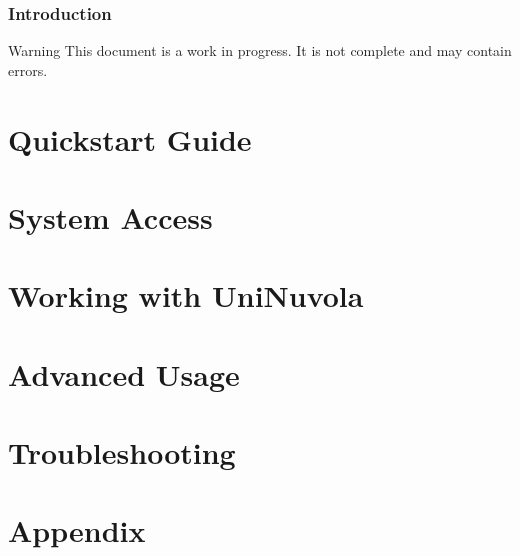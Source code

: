 \documentclass[a4paper,11pt]{article}
\begin{document}


\tableofcontents
\newpage

\section*{Introduction}

\begin{bclogo}[logo=\bcinfo, couleurBarre=orange, noborder=true, couleur=white]{Warning}
This document is a work in progress. It is not complete and may contain errors.
\end{bclogo}



\pagebreak
\part{Quickstart Guide}


\pagebreak
\part{System Access}

\pagebreak
\part{Working with UniNuvola}


\pagebreak
\part{Advanced Usage}


\pagebreak
\part{Troubleshooting}


\pagebreak
\part{Appendix}

\end{document}
